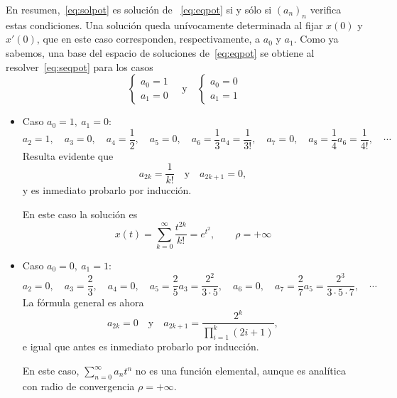 \documentclass[../main.tex]{subfiles}
\begin{document}
\begin{example}
En resumen,~\eqref{eq:solpot} es solución de ~\eqref{eq:eqpot} si y sólo si
\((a_n)_n\) verifica estas condiciones. Una solución queda unívocamente
determinada al fijar \(x(0)\) y \(x'(0)\), que en este caso corresponden,
respectivamente, a \(a_0\) y \(a_1\). Como ya sabemos, una base del espacio de
soluciones de~\eqref{eq:eqpot} se obtiene al resolver~\eqref{eq:seqpot} para los
casos
\[
  \begin{cases}
    a_0 = 1 \\ a_1 = 0
  \end{cases} \quad \text{y} \quad
  \begin{cases}
    a_0 = 0 \\ a_1 = 1
  \end{cases}
\]
\begin{itemize}
\item Caso \(a_0 = 1,\ a_1 = 0\):
  \[a_2 = 1, \quad a_3 = 0, \quad a_4 = \frac{1}{2}, \quad a_5 = 0, \quad a_6 =
    \frac{1}{3}a_4 = \frac{1}{3!}, \quad a_7 = 0, \quad a_8 = \frac{1}{4}a_6 =
    \frac{1}{4!}, \quad \cdots\]
  Resulta evidente que
  \[a_{2k} = \frac{1}{k!} \quad \text{y} \quad a_{2k+1} = 0,\]
  y es inmediato probarlo por inducción.

  En este caso la solución es
  \[x(t) = \sum_{k=0}^\infty \frac{t^{2k}}{k!} = e^{t^2}, \qquad \rho =
    +\infty\]
\item Caso \(a_0 = 0,\ a_1 = 1\):
  \[a_2 = 0, \quad a_3 = \frac{2}{3}, \quad a_4 = 0, \quad a_5 = \frac{2}{5}a_3
    = \frac{2^2}{3 \cdot 5}, \quad a_6 = 0, \quad a_7 = \frac{2}{7}a_5 =
    \frac{2^3}{3 \cdot 5 \cdot 7}, \quad \cdots\]
  La fórmula general es ahora
  \[a_{2k} = 0 \quad \text{y} \quad a_{2k+1} = \frac{2^k}{\prod_{i=1}^k
      (2i+1)},\]
  e igual que antes es inmediato probarlo por inducción.

  En este caso, \(\sum_{n=0}^\infty a_nt^n\) no es una función elemental, aunque
  es analítica con radio de convergencia \(\rho = +\infty\).
\end{itemize}
\end{example}
\end{document}

